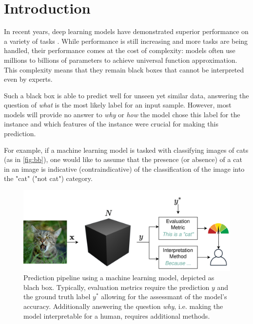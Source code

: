 \section{Introduction}
\label{sec:introduction}




In recent years, deep learning models have demonstrated superior performance on a variety of tasks \cite{ruede2020multi, brinker2019deep, nguyen2020super}. While performance is still increasing and more tasks are being handled, their performance comes at the cost of complexity: models often use millions to billions of parameters to achieve universal function approximation.
This complexity means that they remain black boxes that cannot be interpreted even by experts.

Such a black box is able to predict well for unseen yet similar data, answering the question of \textit{what} is the most likely label for an input sample. 
However, most models will provide no answer to \textit{why} or \textit{how} the model chose this label for the instance and which features of the instance were crucial for making this prediction. 

For example, if a machine learning model is tasked with classifying images of cats (as in \autoref{fig:bb}), one would like to assume that the presence (or absence) of a cat in an image is indicative (contraindicative) of the classification of the image into the "cat" ("not cat") category.

\begin{figure}[t]
    \centering
    \includegraphics[width=\linewidth]{figures/bb_cat.png}
    \caption{Prediction pipeline using a machine learning model, depicted as blach box. Typically, evaluation metrics require the prediction $y$ and the ground truth label $y^*$ allowing for the assessmant of the model's accuracy. Additionally answering the question \textit{why}, i.e. making the model interpretable for a human, requires additional methods.}
    \label{fig:bb}
    \vspace{-0.3cm}
\end{figure}

